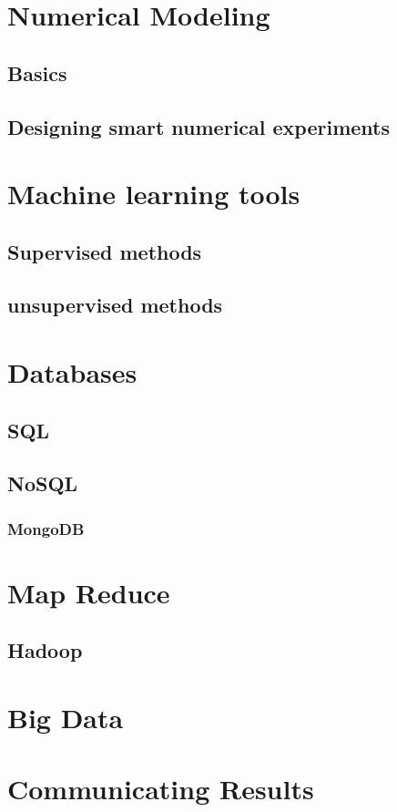 \documentclass[10pt]{PhDthesisPSnPDF}%
\begin{document}
\chapter{Numerical Modeling}\label{numerics}
\section{Basics}\label{numBasics}
\section{Designing smart numerical experiments}\label{NumDesign}
\chapter{Machine learning tools}\label{MLearn}
\section{Supervised methods}
\section{unsupervised methods}
\chapter{Databases}\label{databases}
\section{SQL}
\section{NoSQL}
\subsection{MongoDB}
\chapter{Map Reduce}\label{mapR}
\section{Hadoop}
\chapter{Big Data}\label{bigData}
\chapter{Communicating Results}\label{Commun}
\end{document}
